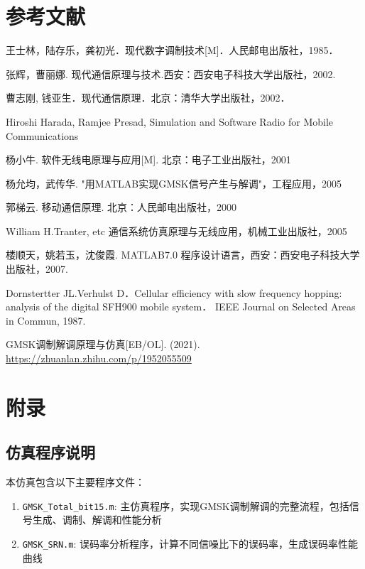 \documentclass[12pt,a4paper,twoside]{article}
\numberwithin{equation}{section}
\begin{document}
\section{参考文献}
\begin{enumerate}[{[}1{]}]
    \item 王士林，陆存乐，龚初光．现代数字调制技术[M]．人民邮电出版社，1985．
    \item 张辉，曹丽娜. 现代通信原理与技术.西安：西安电子科技大学出版社，2002.
    \item 曹志刚, 钱亚生．现代通信原理．北京：清华大学出版社，2002．
    \item Hiroshi Harada, Ramjee Presad, Simulation and Software Radio for Mobile Communications
    \item 杨小牛. 软件无线电原理与应用[M]. 北京：电子工业出版社，2001
    \item 杨允均，武传华. "用MATLAB实现GMSK信号产生与解调"，工程应用，2005
    \item 郭梯云. 移动通信原理. 北京：人民邮电出版社，2000
    \item William H.Tranter, etc 通信系统仿真原理与无线应用，机械工业出版社，2005
    \item 楼顺天，姚若玉，沈俊霞. MATLAB7.0 程序设计语言，西安：西安电子科技大学出版社，2007.
    \item Dornstertter JL.Verhulst D．Cellular efficiency with slow frequency hopping: analysis of the digital SFH900 mobile system． IEEE Journal on Selected Areas in Commun, 1987.
    \item GMSK调制解调原理与仿真[EB/OL]. (2021). \url{https://zhuanlan.zhihu.com/p/1952055509}
\end{enumerate}

\section{附录}
\subsection{仿真程序说明}
本仿真包含以下主要程序文件：
\begin{enumerate}
    \item \texttt{GMSK\_Total\_bit15.m}: 主仿真程序，实现GMSK调制解调的完整流程，包括信号生成、调制、解调和性能分析
    \item \texttt{GMSK\_SRN.m}: 误码率分析程序，计算不同信噪比下的误码率，生成误码率性能曲线
\end{enumerate}
\end{document}
